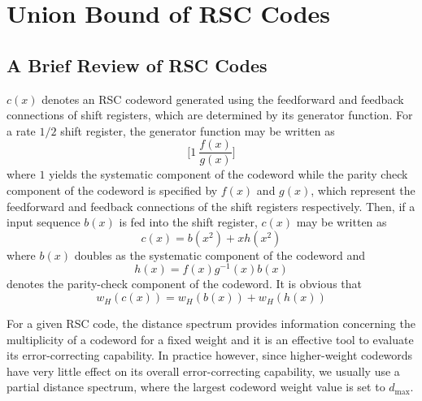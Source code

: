 \section{Union Bound of RSC Codes}
\label{sec2}
\subsection{A Brief Review of RSC Codes}
$c(x)$ denotes an RSC codeword generated using the feedforward and feedback connections of shift registers, which are determined by its generator function. For a rate $1/2$ shift register, the generator function may be written as  $$\Big[1 ~\frac{f(x)}{g(x)}\Big]$$ where $1$ yields the systematic  component  of the codeword while the parity check component of the codeword is specified by  $f(x)$ and $g(x)$, which represent the feedforward and feedback connections of the shift registers respectively. Then, if a input sequence $b(x)$ is fed into the shift register, $c(x)$ may be written as 
\begin{equation}
c(x) = b(x^2)+xh(x^2)
\label{codeword-comp}
\end{equation}
where $b(x)$ doubles as the systematic component of the codeword and
\begin{equation}
h(x) =f(x)g^{-1}(x)b(x)
\label{eq:parity-def}
\end{equation}
denotes the parity-check component of the codeword. It is obvious that 
\begin{equation}
w_H(c(x))=w_H(b(x)) + w_H(h(x))
\label{eq:cw-weight}
\end{equation}

For a given RSC code, the distance spectrum provides information concerning the multiplicity of a codeword for a fixed weight and it is an effective tool to evaluate its error-correcting capability. In practice however, since higher-weight codewords have very little effect on its overall error-correcting capability, we usually use a partial distance spectrum, where the largest codeword weight value is set to $d_{\text{max}}$. 

